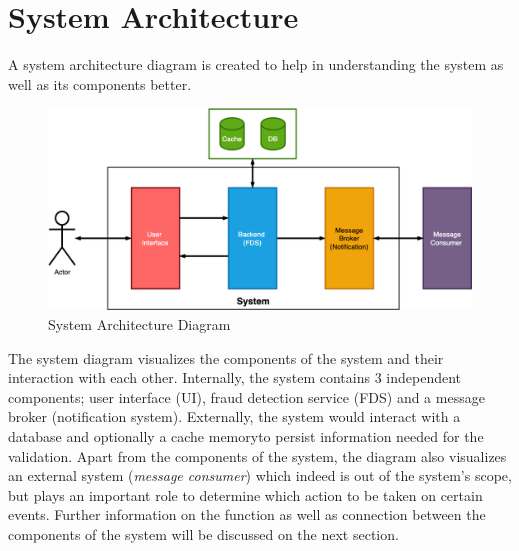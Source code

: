 \section{System Architecture}

A system architecture diagram is created to help in understanding the system as well as its components better. 

\begin{figure}[h]
 \includegraphics[width=\textwidth]{diagrams/system.png}
 \caption{System Architecture Diagram}
\end{figure}
 
The system diagram visualizes the components of the system and their interaction with each other. Internally, the system contains 3 independent components; user interface (UI), fraud detection service (FDS) and a message broker (notification system). 
Externally, the system would interact with a database and optionally a cache memory\footnotemark  to persist information needed for the validation. Apart from the components of the system, the diagram also visualizes an external system (\emph{message consumer}) which  indeed is out of the system's scope, but plays an important role to determine which action to be taken on certain events. Further information on the function as well as connection between the components of the system will be discussed on the next section.

